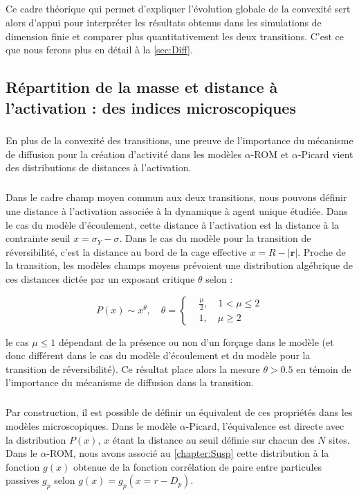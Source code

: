 \subparagraph{}Ce cadre théorique qui permet d'expliquer l'évolution globale de la convexité sert alors d'appui pour interpréter les résultats obtenus dans les simulations de dimension finie et comparer plus quantitativement les deux transitions. C'est ce que nous ferons plus en détail à la \autoref{sec:Diff}.

\subsection{Répartition de la masse et distance à l'activation : des indices microscopiques}

\subparagraph{}En plus de la convexité des transitions, une preuve de l'importance du mécanisme de diffusion pour la création d'activité dans les modèles $\alpha$-ROM et $\alpha$-Picard vient des distributions de distances à l'activation.

\subparagraph{}Dans le cadre champ moyen commun aux deux transitions, nous pouvons définir une distance à l'activation associée à la dynamique à agent unique étudiée. Dans le cas du modèle d'écoulement, cette distance à l'activation est la distance à la contrainte seuil $x = \sigma_Y - \sigma$. Dans le cas du modèle pour la transition de réversibilité, c'est la distance au bord de la cage effective $x = R-|\mathbf{r}|$. Proche de la transition, les modèles champs moyens prévoient une distribution algébrique de ces distances dictée par un exposant critique $\theta$ selon :

\begin{equation}
	P(x) \sim x^\theta, \quad \theta = \left\{
	\begin{aligned}
	&\frac{\mu}{2}, \quad 1 < \mu \leq 2\\
	&1, \quad \mu \geq 2
	\end{aligned}
	\right.
\end{equation}

\noindent le cas $\mu \leq 1$ dépendant de la présence ou non d'un forçage dans le modèle \cite{lin_mean-field_2016} (et donc différent dans le cas du modèle d'écoulement et du modèle pour la transition de réversibilité). Ce résultat place alors la mesure $\theta > 0.5$ en témoin de l'importance du mécanisme de diffusion dans la transition.

\subparagraph{}Par construction, il est possible de définir un équivalent de ces propriétés dans les modèles microscopiques. Dans le modèle $\alpha$-Picard, l'équivalence est directe avec la distribution $P(x)$, $x$ étant la distance au seuil définie sur chacun des $N$ sites. Dans le $\alpha$-ROM, nous avons associé au \autoref{chapter:Susp} cette distribution à la fonction $g(x)$ obtenue de la fonction corrélation de paire entre particules passives $g_p$ selon $g(x) = g_p(x = r - D_p)$.

